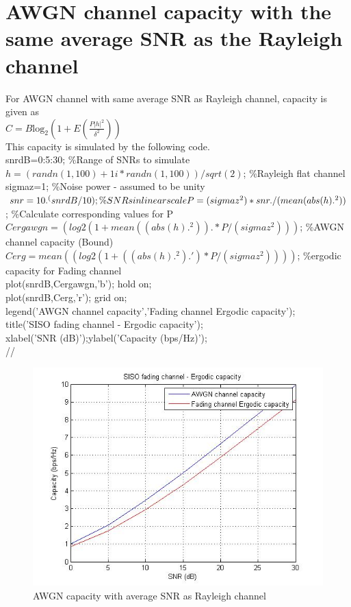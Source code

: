 \documentclass{article}
\begin{document}
\section{AWGN channel capacity with the same average SNR as the Rayleigh channel}
For AWGN channel with same average SNR as Rayleigh channel, capacity is given as \\
$C=B{\mathrm{log}}_{2}\left(1+E\left(\frac{P{\left|h\right|}^{2}}{{\delta }^{2}}\right)\right)$\\
This capacity is simulated by the following code.\\
snrdB=0:5:30; \%Range of SNRs to simulate \\
$h= (randn(1,100) + 1i*randn(1,100) )/sqrt(2)$; \%Rayleigh flat channel\\
sigmaz=1; \%Noise power - assumed to be unity\\
$snr = 10.^(snrdB/10); \%SNRs in linear scale\\
P=(sigmaz^2)*snr./(mean(abs(h).^2))$; \%Calculate corresponding values for P \\
$Cergawgn= (log2(1+ mean((abs(h).^2)).*P/(sigmaz^2)))$; \%AWGN channel capacity (Bound)\\
$Cerg = mean((log2(1+ ((abs(h).^2).')*P/(sigmaz^2))))$; \%ergodic capacity for Fading channel \\
plot(snrdB,Cergawgn,'b'); hold on;\\
plot(snrdB,Cerg,'r'); grid on;\\
legend('AWGN channel capacity','Fading channel Ergodic capacity');\\
title('SISO fading channel - Ergodic capacity');\\
xlabel('SNR (dB)');ylabel('Capacity (bps/Hz)');\\
//
\begin{figure}
	\centering
	\includegraphics[width=1\linewidth]{AWGNasrayleigh}
	\caption{AWGN capacity with average SNR as Rayleigh channel}
	\label{fig:AWGNasrayleigh}
\end{figure}
\end{document}

